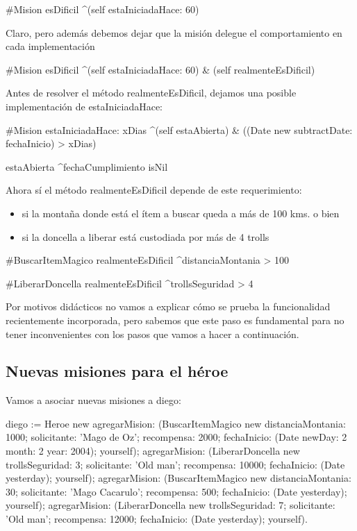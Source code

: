 \documentclass[a4paper,12pt]{book}
\begin{document}
\begin{code}
#Mision
esDificil
	^(self estaIniciadaHace: 60)
\end{code}

Claro, pero además debemos dejar que la misión delegue el comportamiento en cada implementación

\begin{code}
#Mision
esDificil
	^(self estaIniciadaHace: 60) & (self realmenteEsDificil)
\end{code}

Antes de resolver el método realmenteEsDificil, dejamos una posible implementación de estaIniciadaHace:

\begin{code}
#Mision
estaIniciadaHace: xDias
      ^(self estaAbierta) & ((Date new subtractDate: fechaInicio) > xDias)
      
estaAbierta
      ^fechaCumplimiento isNil       
\end{code}

Ahora sí el método realmenteEsDificil depende de este requerimiento:
\begin{itemize}
 \item si la montaña donde está el ítem a buscar queda a más de 100 kms. o bien 
 \item si la doncella a liberar está custodiada por más de 4 trolls
\end{itemize}

\begin{code}
#BuscarItemMagico
realmenteEsDificil      
  ^distanciaMontania > 100

#LiberarDoncella
realmenteEsDificil      
  ^trollsSeguridad > 4
\end{code}

Por motivos didácticos no vamos a explicar cómo se prueba la funcionalidad recientemente incorporada, pero
sabemos que este paso es fundamental para no tener inconvenientes con los pasos que vamos a hacer a continuación.

\subsection{Nuevas misiones para el héroe}
Vamos a asociar nuevas misiones a diego:

\begin{code}
diego := Heroe new
  agregarMision: (BuscarItemMagico new 
			distanciaMontania: 1000;
			solicitante: 'Mago de Oz';
			recompensa: 2000;
			fechaInicio: (Date newDay: 2 month: 2 year: 2004);
			yourself);
  agregarMision: (LiberarDoncella new 
			trollsSeguridad: 3;
			solicitante: 'Old man';
			recompensa: 10000;
			fechaInicio: (Date yesterday);
			yourself);
  agregarMision: (BuscarItemMagico new 
			distanciaMontania: 30;
			solicitante: 'Mago Cacarulo';
			recompensa: 500;
			fechaInicio: (Date yesterday);
			yourself);
  agregarMision: (LiberarDoncella new 
			trollsSeguridad: 7;
			solicitante: 'Old man';
			recompensa: 12000;
			fechaInicio: (Date yesterday);
			yourself).

\end{code}
\end{document}
